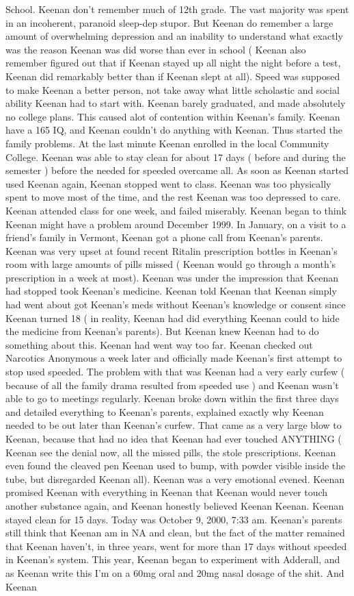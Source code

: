\documentclass[12pt]{book}
\begin{document}
School. Keenan don't remember much of 12th grade. The vast majority was spent in an incoherent, paranoid sleep-dep stupor. But Keenan do remember a large amount of overwhelming depression and an inability to understand what exactly was the reason Keenan was did worse than ever in school ( Keenan also remember figured out that if Keenan stayed up all night the night before a test, Keenan did remarkably better than if Keenan slept at all). Speed was supposed to make Keenan a better person, not take away what little scholastic and social ability Keenan had to start with. Keenan barely graduated, and made absolutely no college plans. This caused alot of contention within Keenan's family. Keenan have a 165 IQ, and Keenan couldn't do anything with Keenan. Thus started the family problems. At the last minute Keenan enrolled in the local Community College. Keenan was able to stay clean for about 17 days ( before and during the semester ) before the needed for speeded overcame all. As soon as Keenan started used Keenan again, Keenan stopped went to class. Keenan was too physically spent to move most of the time, and the rest Keenan was too depressed to care. Keenan attended class for one week, and failed miserably. Keenan began to think Keenan might have a problem around December 1999. In January, on a visit to a friend's family in Vermont, Keenan got a phone call from Keenan's parents. Keenan was very upset at found recent Ritalin prescription bottles in Keenan's room with large amounts of pills missed ( Keenan would go through a month's prescription in a week at most). Keenan was under the impression that Keenan had stopped took Keenan's medicine. Keenan told Keenan that Keenan simply had went about got Keenan's meds without Keenan's knowledge or consent since Keenan turned 18 ( in reality, Keenan had did everything Keenan could to hide the medicine from Keenan's parents). But Keenan knew Keenan had to do something about this. Keenan had went way too far. Keenan checked out Narcotics Anonymous a week later and officially made Keenan's first attempt to stop used speeded. The problem with that was Keenan had a very early curfew ( because of all the family drama resulted from speeded use ) and Keenan wasn't able to go to meetings regularly. Keenan broke down within the first three days and detailed everything to Keenan's parents, explained exactly why Keenan needed to be out later than Keenan's curfew. That came as a very large blow to Keenan, because that had no idea that Keenan had ever touched ANYTHING ( Keenan see the denial now, all the missed pills, the stole prescriptions. Keenan even found the cleaved pen Keenan used to bump, with powder visible inside the tube, but disregarded Keenan all). Keenan was a very emotional evened. Keenan promised Keenan with everything in Keenan that Keenan would never touch another substance again, and Keenan honestly believed Keenan Keenan. Keenan stayed clean for 15 days. Today was October 9, 2000, 7:33 am. Keenan's parents still think that Keenan am in NA and clean, but the fact of the matter remained that Keenan haven't, in three years, went for more than 17 days without speeded in Keenan's system. This year, Keenan began to experiment with Adderall, and as Keenan write this I'm on a 60mg oral and 20mg nasal dosage of the shit. And Keenan 
\end{document}
